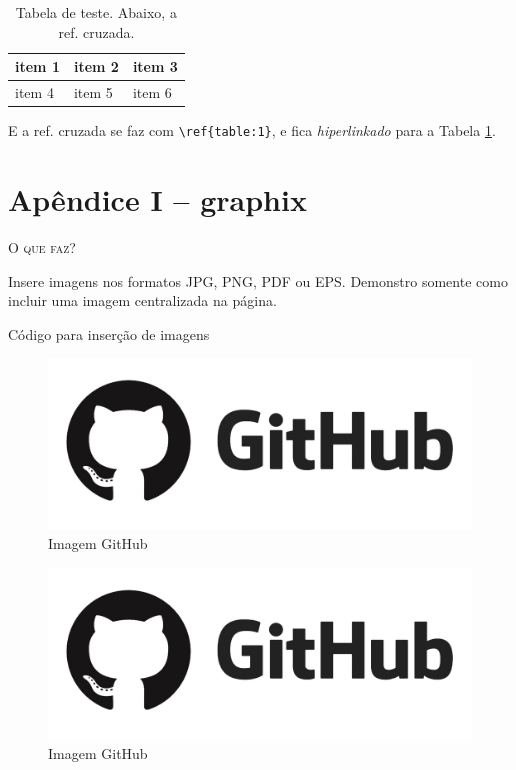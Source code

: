 \begin{table}[h!]
    \begin{center}
	\begin{tabularx}{0.8\textwidth} { 
	| >{\centering\arraybackslash}X 
	| >{\centering\arraybackslash}X 
	| >{\centering\arraybackslash}X | }
	\hline
	item 1 & item 2 & item 3 \\
	\hline
	item 4  & item 5  & item 6  \\
	\hline
	\end{tabularx}
	\caption{Tabela de teste. Abaixo, a ref. cruzada.}
	\label{table:1}
	\end{center}
\end{table}

E a ref. cruzada se faz com \verb|\ref{table:1}|, e fica \textit{hiperlinkado} para a Tabela \ref{table:1}.

\chapter*{Apêndice I -- graphix}

\noindent\textsc{O que faz?}

Insere imagens nos formatos JPG, PNG, PDF ou EPS. Demonstro somente como incluir uma imagem centralizada na página.

\begin{codex}{Código para inserção de imagens}
\begin{figure}[h!]
	\begin{center}
		\includegraphics[scale=.30]{./img/github.png}
		\caption{Imagem GitHub}
		\label{fig:github}
	\end{center}
\end{figure}
\end{codex}

\begin{figure}[h!]
	\begin{center}
		\includegraphics[scale=.30]{./img/github.png}
		\caption{Imagem GitHub}
		\label{fig:github}
	\end{center}
\end{figure}

